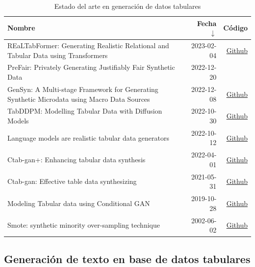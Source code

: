 \begin{table}[H]
	\centering
	\caption{Estado del arte en generación de datos tabulares}
	\label{tab-sota-tab}
    \begin{tabular}{|m{28em}|r|r|}
    \hline
    \rowcolor[gray]{0.8}
    Nombre & Fecha $\downarrow$ & Código \\
    \hline
    REaLTabFormer: Generating Realistic Relational and Tabular Data using Transformers \cite{solatorio_realtabformer_2023}
    & 2023-02-04 & \href{https://github.com/avsolatorio/REaLTabFormer}{Github} \\
    \hline
    PreFair: Privately Generating Justifiably Fair Synthetic Data \cite{pujol_prefair_2022}
    & 2022-12-20 & \\
    \hline
    GenSyn: A Multi-stage Framework for Generating Synthetic Microdata using Macro Data Sources \cite{acharya_gensyn_2022}
    & 2022-12-08 & \href{https://github.com/Angeela03/GenSyn}{Github} \\
    \hline
    TabDDPM: Modelling Tabular Data with Diffusion Models \cite{kotelnikov_tabddpm_2022}
    & 2022-10-30 & \href{https://github.com/rotot0/tab-ddpm}{Github} \\
    \hline
    Language models are realistic tabular data generators \cite{borisov_language_2022}
    & 2022-10-12 & \href{https://github.com/kathrinse/be_great}{Github} \\
    \hline
    Ctab-gan+: Enhancing tabular data synthesis \cite{zhao_ctab-gan_2022}
    & 2022-04-01 & \href{https://github.com/Team-TUD/CTAB-GAN-Plus}{Github} \\
    \hline
    Ctab-gan: Effective table data synthesizing \cite{zhao_ctab-gan_2021}
    & 2021-05-31 & \href{https://github.com/Team-TUD/CTAB-GAN}{Github} \\
    \hline
    Modeling Tabular data using Conditional GAN \cite{xu_modeling_2019}
    & 2019-10-28 & \href{https://github.com/sdv-dev/SDV}{Github} \\
    \hline
    Smote: synthetic minority over-sampling technique \cite{chawla_smote_2002}
    & 2002-06-02 & \href{https://github.com/scikit-learn-contrib/imbalanced-learn}{Github} \\
    \hline
    \end{tabular}
\end{table}

\newpage
\subsection{Generación de texto en base de datos tabulares}

